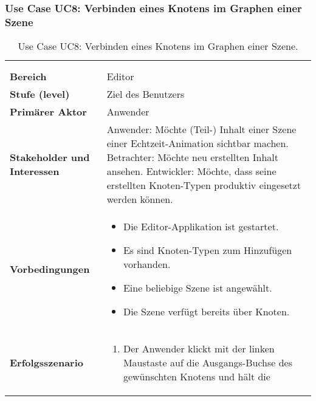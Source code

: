 
\subsubsection{Use Case UC8: Verbinden eines Knotens im Graphen einer Szene}
\label{ssubsec:requirements:use-cases:uc8}

\begin{longtabu}{p{0.5\textwidth}p{0.5\textwidth}}
    \centering\\
    \caption{Use Case UC8: Verbinden eines Knotens im Graphen einer
        Szene.}\label{table:uc8-connect-node}\\
    \toprule
        \textbf{Bereich} &
        Editor \\
    \cmidrule(r){1-1}\cmidrule(lr){2-2}
        \textbf{Stufe (level)} &
        Ziel des Benutzers \\
    \cmidrule(r){1-1}\cmidrule(lr){2-2}
        \textbf{Primärer Aktor} &
        Anwender \\
    \cmidrule(r){1-1}\cmidrule(lr){2-2}
        \textbf{Stakeholder und Interessen} &
        Anwender: Möchte (Teil-) Inhalt einer Szene einer
        Echtzeit-Animation sichtbar machen.\newline
        Betrachter: Möchte neu erstellten Inhalt ansehen.\newline
        Entwickler: Möchte, dass seine erstellten Knoten-Typen produktiv
        eingesetzt werden können. \\
    \cmidrule(r){1-1}\cmidrule(lr){2-2}
        \textbf{Vorbedingungen} &
        \begin{itemize}
            \item{Die Editor-Applikation ist gestartet.}
            \item{Es sind Knoten-Typen zum Hinzufügen vorhanden.}
            \item{Eine beliebige Szene ist angewählt.}
            \item{Die Szene verfügt bereits über Knoten.}
        \end{itemize} \\
    \cmidrule(r){1-1}\cmidrule(lr){2-2}
        \textbf{Erfolgsszenario} &
        \begin{enumerate}
            \item{Der Anwender klickt mit der linken Maustaste auf die
                    Ausgangs-Buchse des gewünschten Knotens und hält die
}
\end{enumerate}
\end{longtabu}
